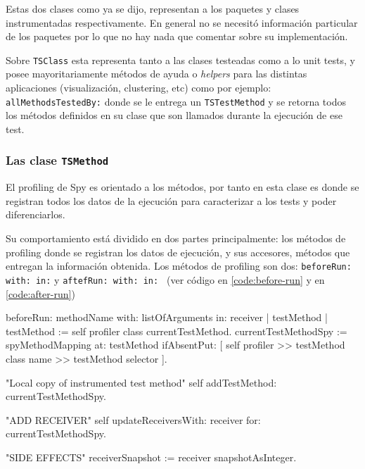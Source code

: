 \par Estas dos clases como ya se dijo, representan a los paquetes y clases instrumentadas respectivamente. En general no se necesitó información particular de los paquetes por lo que no hay nada que comentar sobre su implementación.

\par Sobre {\tt TSClass} esta representa tanto a las clases testeadas como a lo unit tests, y posee mayoritariamente métodos de ayuda o \emph{helpers} para las distintas aplicaciones (visualización, clustering, etc) como por ejemplo: {\tt allMethodsTestedBy:} donde se le entrega un {\tt TSTestMethod} y se retorna todos los métodos definidos en su clase que son llamados durante la ejecución de ese test.  

\subsubsection{Las clase {\tt TSMethod} }
\par El profiling de Spy es orientado a los métodos, por tanto en esta clase es donde se registran todos los datos de la ejecución para caracterizar a los tests y poder diferenciarlos.
\par Su comportamiento está dividido en dos partes principalmente: los métodos de profiling donde se registran los datos de ejecución, y sus accesores, métodos que entregan la información obtenida. Los métodos de profiling son dos: {\tt beforeRun: with: in:} y {\tt aftefRun: with: in: } (ver código en \ref{code:before-run} y en \ref{code:after-run})

\begin{codeWithLineNumbers}
beforeRun: methodName with: listOfArguments in: receiver
	| testMethod |
	testMethod := self profiler class currentTestMethod.
	currentTestMethodSpy := 
			spyMethodMapping at: testMethod ifAbsentPut: 
				[ self profiler >> testMethod class name >> testMethod selector ].
		
	"Local copy of instrumented test method"	
	self addTestMethod: currentTestMethodSpy.

	"ADD RECEIVER"
	self updateReceiversWith: receiver for: currentTestMethodSpy.

	"SIDE EFFECTS"
	receiverSnapshot := receiver snapshotAsInteger.

\end{codeWithLineNumbers}\label{code:before-run} 

